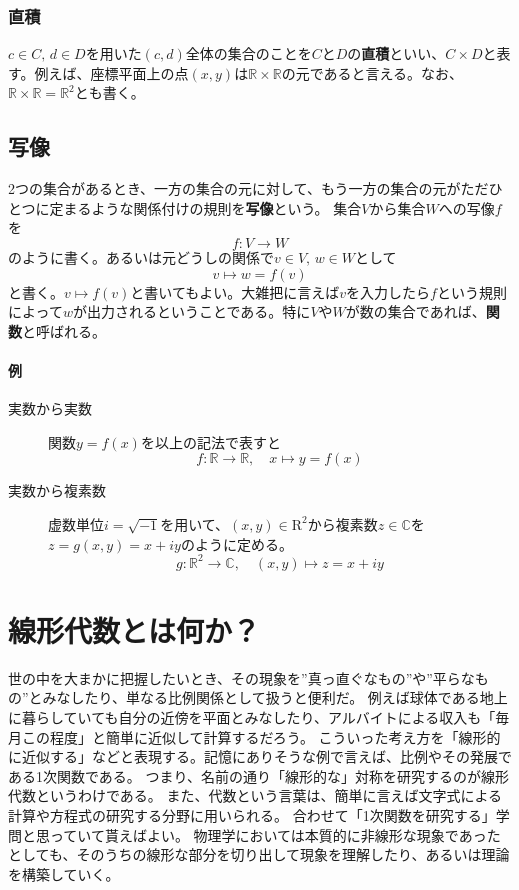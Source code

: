 \documentclass[10pt]{jsarticle}
\theoremstyle{definition}%
\numberwithin{equation}{section}%
\begin{document}
\subsubsection{直積}
$c \in C, \, d\in D$を用いた$(c,d)$全体の集合のことを$C$と$D$の{\bf 直積}といい、$C\times D$と表す。例えば、座標平面上の点$(x,y)$は$\mathbb{R}\times \mathbb{R}$の元であると言える。なお、$\mathbb{R}\times \mathbb{R}=\mathbb{R}^{2}$とも書く。
\subsection{写像}
2つの集合があるとき、一方の集合の元に対して、もう一方の集合の元がただひとつに定まるような関係付けの規則を{\bf 写像}という。 
集合$V$から集合$W$への写像$f$を
\begin{equation}
  f:V \to W
\end{equation}
のように書く。あるいは元どうしの関係で$v\in V, \, w\in W$として
\begin{equation}
  v \mapsto w= f(v)
\end{equation}
と書く。$v \mapsto f(v)$と書いてもよい。大雑把に言えば$v$を入力したら$f$という規則によって$w$が出力されるということである。特に$V$や$W$が数の集合であれば、{\bf 関数}と呼ばれる。
\paragraph{例}
\begin{description}
  \item[実数から実数] 関数$y=f(x)$を以上の記法で表すと
  \begin{equation}
   f:\mathbb{R}\to\mathbb{R}, \quad x\mapsto y=f(x)
  \end{equation}
 \item[実数から複素数] 虚数単位$i=\sqrt{-1}$を用いて、$(x,y)\in \mathrm{R}^{2}$から複素数$z\in \mathbb{C}$を$z=g(x,y)=x+iy$のように定める。
 \begin{equation}
  g:\mathbb{R}^{2}\to \mathbb{C},\quad (x,y)\mapsto z=x+iy
 \end{equation}
 
\end{description}
\section{線形代数とは何か？}
世の中を大まかに把握したいとき、その現象を''真っ直ぐなもの''や''平らなもの''とみなしたり、単なる比例関係として扱うと便利だ。
例えば球体である地上に暮らしていても自分の近傍を平面とみなしたり、アルバイトによる収入も「毎月この程度」と簡単に近似して計算するだろう。
こういった考え方を「線形的に近似する」などと表現する。記憶にありそうな例で言えば、比例やその発展である1次関数である。
つまり、名前の通り「線形的な」対称を研究するのが線形代数というわけである。
また、代数という言葉は、簡単に言えば文字式による計算や方程式の研究する分野に用いられる。
合わせて「1次関数を研究する」学問と思っていて貰えばよい。
物理学においては本質的に非線形な現象であったとしても、そのうちの線形な部分を切り出して現象を理解したり、あるいは理論を構築していく。
\end{document}
